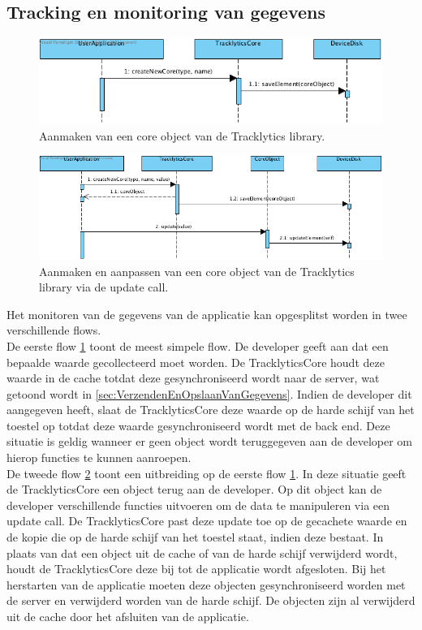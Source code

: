 \subsection{Tracking en monitoring van gegevens}\label{sec:TrackingEnMonitoringVanGegevens}
\begin{figure}[!h]
  \centering
  \includegraphics[scale=0.4]{Afbeeldingen/Architectuur/FlowDiagram1}
  \caption{Aanmaken van een core object van de Tracklytics library.}
  \label{fig:flow1}
\end{figure}
\begin{figure}[!h]
  \centering
  \includegraphics[scale=0.4]{Afbeeldingen/Architectuur/FlowDiagram2}
  \caption{Aanmaken en aanpassen van een core object van de Tracklytics library via de update call.}
  \label{fig:flow2}
\end{figure}

Het monitoren van de gegevens van de applicatie kan opgesplitst worden in twee verschillende flows. \\

De eerste flow \ref{fig:flow1} toont de meest simpele flow. De developer geeft aan dat een bepaalde waarde gecollecteerd moet worden. De TracklyticsCore houdt deze waarde in de cache totdat deze gesynchroniseerd wordt naar de server, wat getoond wordt in \ref{sec:VerzendenEnOpslaanVanGegevens}. Indien de developer dit aangegeven heeft, slaat de TracklyticsCore deze waarde op de harde schijf van het toestel op totdat deze waarde gesynchroniseerd wordt met de back end. Deze situatie is geldig wanneer er geen object wordt teruggegeven aan de developer om hierop functies te kunnen aanroepen. \\

De tweede flow \ref{fig:flow2} toont een uitbreiding op de eerste flow \ref{fig:flow1}. In deze situatie geeft de TracklyticsCore een object terug aan de developer. Op dit object kan de developer verschillende functies uitvoeren om de data te manipuleren via een update call. De TracklyticsCore past deze update toe op de gecachete waarde en de kopie die op de harde schijf van het toestel staat, indien deze bestaat. In plaats van dat een object uit de cache of van de harde schijf verwijderd wordt, houdt de TracklyticsCore deze bij tot de applicatie wordt afgesloten. Bij het herstarten van de applicatie moeten deze objecten gesynchroniseerd worden met de server en verwijderd worden van de harde schijf. De objecten zijn al verwijderd uit de cache door het afsluiten van de applicatie.


